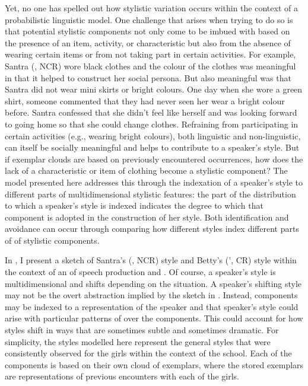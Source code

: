 \noindent Yet, no one has spelled out how stylistic variation occurs within the context of a probabilistic linguistic model.  One challenge that arises when trying to do so is that potential stylistic components not only come to be imbued with  based on the presence of an item, activity, or characteristic but also from the absence of wearing certain items or from not taking part in certain activities.  For example, Santra (, NCR) wore black clothes and the colour of the clothes was meaningful in that it helped to construct her social persona.  But also meaningful was that Santra did not wear mini skirts or bright colours.  One day when she wore a green shirt, someone commented that they had never seen her wear a bright colour before.  Santra confessed that she didn't feel like herself and was looking forward to going home so that she could change clothes.  Refraining from participating in certain activities (e.g., wearing bright colours), both linguistic and non-linguistic, can itself be socially meaningful and helps to contribute to a speaker's style.  But if exemplar clouds are based on previously encountered occurrences, how does the lack of a characteristic or item of clothing become a stylistic component?  The model presented here addresses this through the indexation of a speaker's style to different parts of multidimensional stylistic features: the part of the distribution to which a speaker's style is indexed indicates the degree to which that component is adopted in the construction of her style.  Both identification and avoidance can occur through comparing how different styles index different parts of  of stylistic components.

In , I present a sketch of Santra's (, NCR) style and Betty's (', CR) style within the context of an  of speech production and .  Of course, a speaker's style is multidimensional and shifts depending on the situation.  A speaker's shifting style may not be the overt abstraction implied by the sketch in .  Instead, components may be indexed to a representation of the speaker and that speaker's style could arise with particular patterns of  over the components.  This could account for how styles shift in ways that are sometimes subtle and sometimes dramatic.  For simplicity, the styles modelled here represent the general styles that were consistently observed for the girls within the context of the school.  Each of the components is based on their own cloud of exemplars, where the stored exemplars are representations of previous encounters with each of the girls.  

